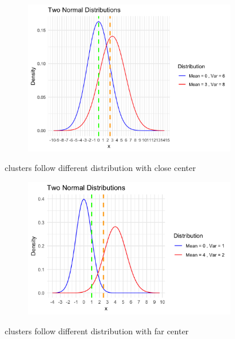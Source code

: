 \documentclass{article}
\begin{document}

\begin{figure}[h]
  \centering
  \begin{subfigure}{0.8\textwidth}
      \centering
      \includegraphics[width=\textwidth]{images/dist_simu/1-0_6-3_8.png}
  \end{subfigure}
  \caption{clusters follow different distribution with close center}
  \label{fig:close_dist}
\end{figure}


\begin{figure}[h]
  \centering
  \begin{subfigure}{0.8\textwidth}
      \centering
      \includegraphics[width=\textwidth]{images/dist_simu/2-0_1-4_2.png}
  \end{subfigure}
  \caption{clusters follow different distribution with far center}
  \label{fig:far_dist}
\end{figure}
\end{document}
